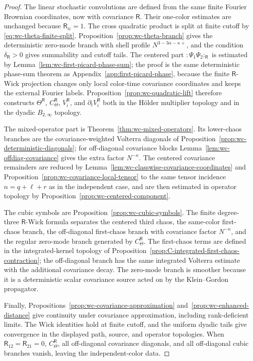 \documentclass[10pt]{amsart}
\numberwithin{equation}{section}
\theoremstyle{plain}
\theoremstyle{definition}
\theoremstyle{remark}
\begin{document}
\begin{proof}
The linear stochastic convolutions are defined from the same finite Fourier Brownian coordinates, now with covariance \(\mathsf R\).  Their one-color estimates are unchanged because \(\mathsf R_{ii}=1\).  The cross quadratic product is split at finite cutoff by \eqref{eq:wc-theta-finite-split}.  Proposition~\ref{prop:wc-theta-branch} gives the deterministic zero-mode branch with shell profile \(N^{3-3\alpha-\kappa+}\), and the condition \(\delta_{\mathsf R}>0\) gives summability and cutoff tails.  The centered part \(:\Psi_1\Psi_2:_{\mathsf R}\) is estimated by Lemma~\ref{lem:wc-first-picard-phase-sum}; the proof is the same deterministic phase-sum theorem as Appendix~\ref{app:first-picard-phase}, because the finite \(\mathsf R\)-Wick projection changes only local color-time covariance coordinates and keeps the external Fourier labels.  Proposition~\ref{prop:wc-quadratic-lift} therefore constructs \(\Theta^{\mathsf R}\), \(C_\Theta^{\mathsf R}\), \(V_i^{\mathsf R}\), and \(\partial_tV_i^{\mathsf R}\) both in the H\"older multiplier topology and in the dyadic \(B_{2,\infty}\) topology.

The mixed-operator part is Theorem~\ref{thm:wc-mixed-operators}.  Its lower-chaos branches are the covariance-weighted Volterra diagonals of Proposition~\ref{prop:wc-deterministic-diagonals}; for off-diagonal covariance blocks Lemma~\ref{lem:wc-offdiag-covariance} gives the extra factor \(N^{-\kappa}\).  The centered covariance remainders are reduced by Lemma~\ref{lem:wc-classwise-covariance-coordinates} and Proposition~\ref{prop:wc-covariance-local-tensor} to the same tensor incidence \(n=q+\ell+r\) as in the independent case, and are then estimated in operator topology by Proposition~\ref{prop:wc-centered-component}.

The cubic symbols are Proposition~\ref{prop:wc-cubic-symbols}.  The finite degree-three \(\mathsf R\)-Wick formula separates the centered third chaos, the same-color first-chaos branch, the off-diagonal first-chaos branch with covariance factor \(N^{-\kappa}\), and the regular zero-mode branch generated by \(C_\Theta^{\mathsf R}\).  The first-chaos terms are defined in the integrated-kernel topology of Proposition~\ref{prop:C-integrated-first-chaos-contraction}; the off-diagonal branch has the same integrated Volterra estimate with the additional covariance decay.  The zero-mode branch is smoother because it is a deterministic scalar covariance source acted on by the Klein--Gordon propagator.

Finally, Propositions~\ref{prop:wc-covariance-approximation} and~\ref{prop:wc-enhanced-distance} give continuity under covariance approximation, including rank-deficient limits.  The Wick identities hold at finite cutoff, and the uniform dyadic tails give convergence in the displayed path, source, and operator topologies.  When \(\mathsf R_{12}=\mathsf R_{21}=0\), \(C_\Theta^{\mathsf R}\), all off-diagonal covariance diagonals, and all off-diagonal cubic branches vanish, leaving the independent-color data.
\end{proof}
\end{document}
